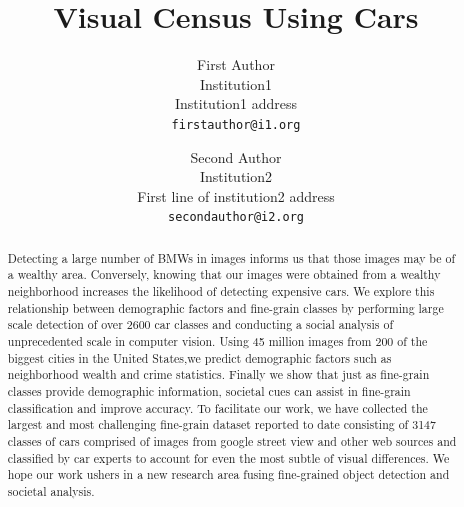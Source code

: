 \documentclass[10pt,twocolumn,letterpaper]{article}
\begin{document}
\title{Visual Census Using Cars}

\author{First Author\\
Institution1\\
Institution1 address\\
{\tt\small firstauthor@i1.org}
\and
Second Author\\
Institution2\\
First line of institution2 address\\
{\tt\small secondauthor@i2.org}
}

\maketitle

\begin{abstract}
Detecting a large number of BMWs in images informs us that those images may be of a wealthy area. Conversely, knowing that our images were obtained from a wealthy neighborhood increases the likelihood of detecting expensive cars. We explore this relationship between demographic factors and fine-grain classes by performing large scale detection of over 2600 car classes and conducting a social analysis of unprecedented scale in computer vision. Using 45 million images from 200 of the biggest cities in the United States,we predict demographic factors such as neighborhood wealth and crime statistics. Finally we show that just as fine-grain classes provide demographic information, societal cues can assist in fine-grain classification and improve accuracy. To facilitate our work, we have collected the largest and most challenging fine-grain dataset reported to date consisting of 3147 classes of cars comprised of images from google street view and other web sources and classified by car experts to account for even the most subtle of visual differences. We hope our work ushers in a new research area fusing fine-grained object detection and societal analysis.
\end{abstract}
\end{document}
